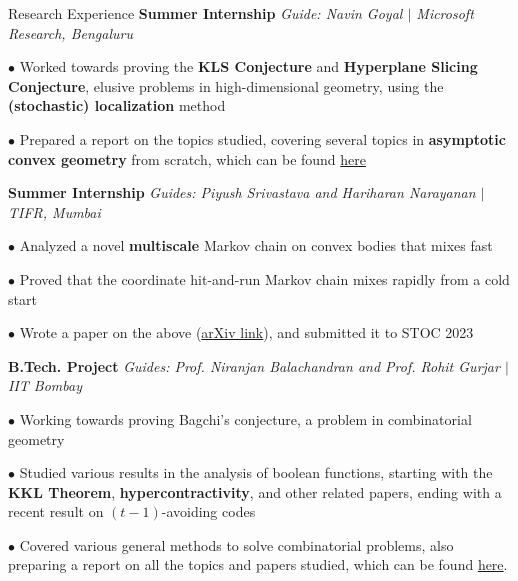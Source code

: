 \begin{rubric}{Research Experience}
    \entry*[2021] \textbf{Summer Internship} \hfill \emph{Guide: Navin Goyal $\mid$ Microsoft Research, Bengaluru}
        
        $\bullet$ Worked towards proving the \textbf{KLS Conjecture} and \textbf{Hyperplane Slicing Conjecture}, elusive problems in high-dimensional geometry, using the \textbf{(stochastic) localization} method

        $\bullet$ Prepared a report on the topics studied, covering several topics in \textbf{asymptotic convex geometry} from scratch, which can be found \href{https://amitrajaraman.github.io/notes/convex-geometry/main.pdf}{here}

    \entry*[2022] \textbf{Summer Internship} \hfill \emph{Guides: Piyush Srivastava and Hariharan Narayanan $\mid$ TIFR, Mumbai}

        $\bullet$ Analyzed a novel \textbf{multiscale} Markov chain on convex bodies that mixes fast

        $\bullet$ Proved that the coordinate hit-and-run Markov chain mixes rapidly from a cold start

        $\bullet$ Wrote a paper on the above (\href{https://arxiv.org/abs/2211.04439}{arXiv link}), and submitted it to STOC 2023

    \entry*[\phantom{.}2022] \textbf{B.Tech. Project} \hfill \emph{Guides: Prof. Niranjan Balachandran and Prof. Rohit Gurjar $\mid$ IIT Bombay}

        $\bullet$ Working towards proving Bagchi's conjecture, a problem in combinatorial geometry

        $\bullet$ Studied various results in the analysis of boolean functions, starting with the \textbf{KKL Theorem}, \textbf{hypercontractivity}, and other related papers, ending with a recent result on $(t-1)$-avoiding codes

        $\bullet$ Covered various general methods to solve combinatorial problems, also preparing a report on all the topics and papers studied, which can be found \href{https://amitrajaraman.github.io/research/pls/btp-1.pdf}{here}.

\end{rubric}